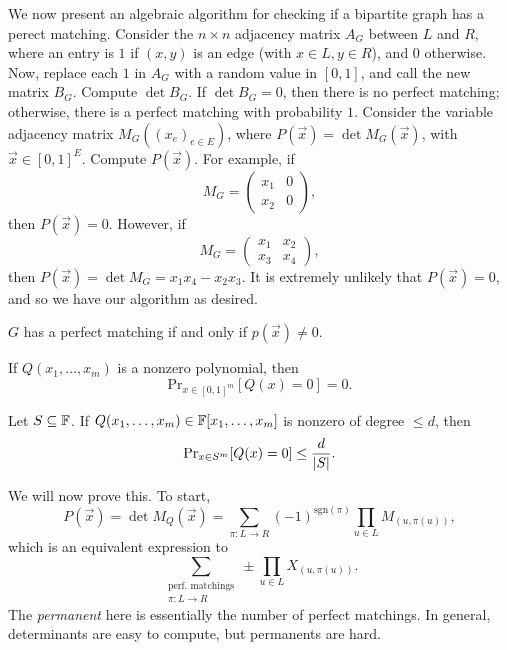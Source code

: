 We now present an algebraic algorithm for checking if a bipartite graph has a perect matching. Consider the $n \times n$ adjacency matrix $A_G$ between $L$ and $R$, where an entry is $1$ if $(x, y)$ is an edge (with $x \in L, y \in R$), and $0$ otherwise. Now, replace each $1$ in $A_G$ with a random value in $[0, 1]$, and call the new matrix $B_G$. Compute $\det B_G$. If $\det B_G = 0$, then there is no perfect matching; otherwise, there is a perfect matching with probability $1$.
\medskip\newline
Consider the variable adjacency matrix $M_G((x_e)_{e \in E})$, where $P(\vec{x}) = \det M_G(\vec{x})$, with $\vec{x} \in [0, 1]^E$. Compute $P(\vec{x})$. For example, if
\[ M_G = \begin{pmatrix} x_1 & 0 \\ x_2 & 0 \end{pmatrix}, \]
then $P(\vec{x}) = 0$. However, if
\[ M_G = \begin{pmatrix} x_1 & x_2 \\ x_3 & x_4 \end{pmatrix}, \]
then $P(\vec{x}) = \det M_G = x_1 x_4 - x_2 x_3$. It is extremely unlikely that $P(\vec{x}) = 0$, and so we have our algorithm as desired.
\begin{simplelemma}
    $G$ has a perfect matching if and only if $p(\vec{x}) \neq 0$.
\end{simplelemma}
\begin{simplelemma}
    If $Q(x_1, \dots, x_m)$ is a nonzero polynomial, then
    \[ \mathrm{Pr}_{x \in [0, 1]^m} [Q(x) = 0] = 0. \]
\end{simplelemma}
\begin{simplelemma}
    Let $S \subseteq \mathbb F$. If $Q(x_1, \dots, x_m) \in \mathbb F[x_1, \dots, x_m]$ is nonzero of degree $\leq d$, then
    \[ \mathrm{Pr}_{x \in S^m}[Q(x) = 0] \leq \frac{d}{\left\lvert S \right\rvert}. \]
\end{simplelemma}
\noindent We will now prove this. To start,
\[ P(\vec{x}) = \det M_Q(\vec{x}) = \sum_{\pi : L \to R} (-1)^{\mathrm{sgn}(\pi)} \prod_{u \in L} M_{(u, \pi(u))}, \]
which is an equivalent expression to
\[ \sum_{\substack{\text{perf. matchings} \\ \pi : L \to R }} \pm \prod_{u \in L} X_{(u, \pi(u))}. \]
The \textit{permanent} here is essentially the number of perfect matchings. In general, determinants are easy to compute, but permanents are hard.
\medskip\newline
